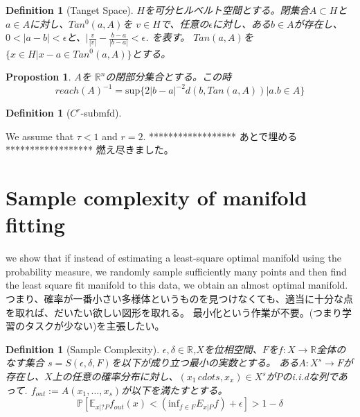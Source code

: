 \documentclass{ujarticle}
\newtheorem{dfn}[thm]{Definition}
\newtheorem{prop}[thm]{Propostion}
\begin{document}
\begin{dfn}[Tanget Space]
$H$を可分ヒルベルト空間とする。閉集合$A \subset H$と$a \in A$に対し、$Tan^0(a,A)$を
$v \in H$で、任意の$\epsilon$に対し、ある$b \in A$が存在し、$0 <|a -b| < \epsilon$と、$|\frac{v}{|v|} - \frac{b-a}{|b-a|} < \epsilon$.
を表す。
$Tan(a,A)$を$\{x \in H| x -a \in Tan^0(a,A)\}$とする。
\end{dfn}
\begin{prop} $A$を $\mathbb{R}^n$の閉部分集合とする。この時
  \begin{equation*}
   reach(A)^{-1}=\mathrm{sup}\{2|b-a|^{-2}d(b,Tan(a,A)) | a.b \in A\}
  \end{equation*}
\end{prop}
\begin{dfn}[$C^r$-submfd]

\end{dfn}
We assume that $\tau < 1$ and $r = 2$.
******************
 あとで埋める
******************
燃え尽きました。


\section{Sample complexity of manifold fitting}
\label{Sample complexity of manifold fitting}

we show that if instead of estimating a least-square optimal manifold using the probability
measure, we randomly sample sufficiently many points and then find the least square fit manifold to this
data, we obtain an almost optimal manifold.
つまり、確率が一番小さい多様体というものを見つけなくても、適当に十分な点を取れば、だいたい欲しい図形を取れる。
最小化という作業が不要。(つまり学習のタスクが少ない)を主張したい。

\begin{dfn}[Sample Complexity]
$\epsilon, \delta \in \mathbb{R}$,$X$を位相空間、$F$を$f:X \to \mathbb{R}$全体のなす集合
$s=S(\epsilon,\delta,F)$を以下が成り立つ最小の実数とする。
ある$A:X^s \to F$が存在し、$X$上の任意の確率分布に対し、$(x_1\,cdots ,x_x) \in X^s$が$P$のi.i.dな列であって.
$f_{out}:= A(x_1,\dots,x_s)$が以下を満たすとする。
\begin{equation*}
 \mathbb{P}[\mathbb{E}_{x|?P}f_{out}(x) < (\mathrm{inf}_{f \in F}E_{x|P}f) + \epsilon ] > 1 - \delta
\end{equation*}

\end{dfn}
\end{document}
